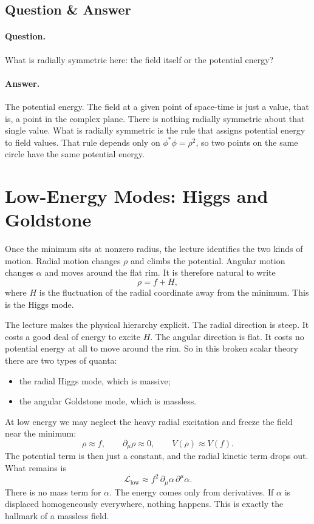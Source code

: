 \subsection{Question \& Answer}

\paragraph{Question.} What is radially symmetric here: the field itself or the potential energy?

\paragraph{Answer.} The potential energy. The field at a given point of space-time is just a value, that is, a point in the complex plane. There is nothing radially symmetric about that single value. What is radially symmetric is the rule that assigns potential energy to field values. That rule depends only on \(\phi^*\phi=\rho^2\), so two points on the same circle have the same potential energy.

\section{Low-Energy Modes: Higgs and Goldstone}

Once the minimum sits at nonzero radius, the lecture identifies the two kinds of motion. Radial motion changes \(\rho\) and climbs the potential. Angular motion changes \(\alpha\) and moves around the flat rim. It is therefore natural to write
\begin{equation}
\rho = f + H,
\end{equation}
where \(H\) is the fluctuation of the radial coordinate away from the minimum. This is the Higgs mode.

The lecture makes the physical hierarchy explicit. The radial direction is steep. It costs a good deal of energy to excite \(H\). The angular direction is flat. It costs no potential energy at all to move around the rim. So in this broken scalar theory there are two types of quanta:

\begin{itemize}
\item the radial Higgs mode, which is massive;
\item the angular Goldstone mode, which is massless.
\end{itemize}

At low energy we may neglect the heavy radial excitation and freeze the field near the minimum:
\begin{equation}
\rho \approx f,
\qquad
\partial_\mu\rho \approx 0,
\qquad
V(\rho)\approx V(f).
\end{equation}
The potential term is then just a constant, and the radial kinetic term drops out. What remains is
\begin{equation}
\mathcal L_{\mathrm{low}}
\approx
f^2\,\partial_\mu\alpha\,\partial^\mu\alpha.
\end{equation}
There is no mass term for \(\alpha\). The energy comes only from derivatives. If \(\alpha\) is displaced homogeneously everywhere, nothing happens. This is exactly the hallmark of a massless field.

